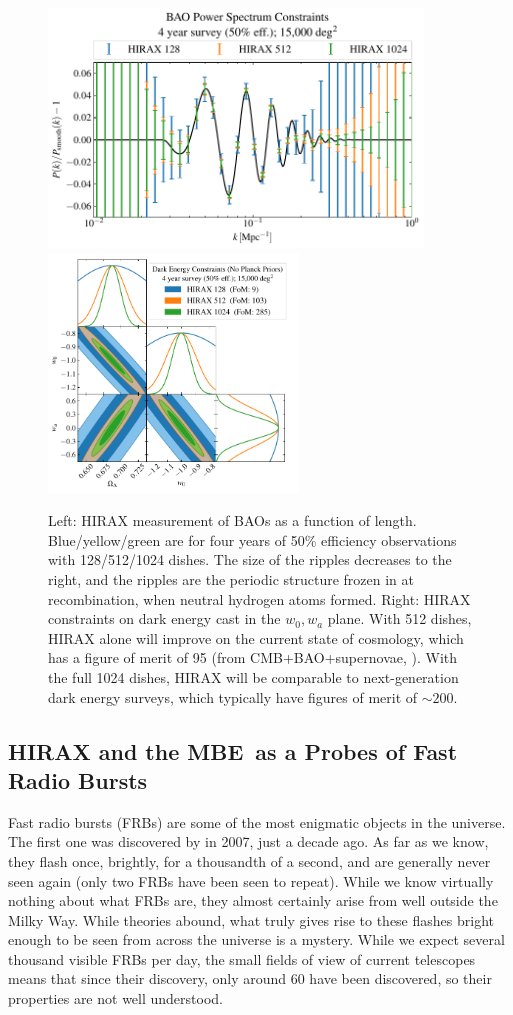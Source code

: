 \documentclass[letterpaper,11pt,preprint]{aastex}
\newcommand{\mbe}{{\rm MBE}}
\begin{document}
\begin{figure}[tbh]
  \includegraphics[height=2.5in]{hirax_bao_ps.pdf}
  \includegraphics[height=2.5in]{hirax_de_constraints.pdf}
\caption{\small Left:  HIRAX measurement of BAOs as a function of
  length.  Blue/yellow/green are for four years of 50\% efficiency
  observations with 128/512/1024 dishes.  The size of the ripples
  decreases to the right, and the ripples are the periodic structure
  frozen in at recombination, when neutral hydrogen atoms formed.
  Right:  HIRAX constraints on dark energy cast in the $w_0,w_a$
  plane.  With 512 dishes, HIRAX alone will improve on the current
  state of cosmology, which has a figure of merit of 95 (from
  CMB+BAO+supernovae, \citet{Planck2018Params}).  With the full 1024
  dishes, HIRAX will be comparable to next-generation dark energy
  surveys, which typically have figures of merit of $\sim 200$.
  \label{fig:hirax_de}
}
\end{figure}

\subsection{HIRAX and the \mbe\ as a Probes of Fast Radio Bursts}
Fast radio bursts (FRBs) are some of the most enigmatic objects in the
universe.  The first one was discovered by \citet{Lorimer07} in 2007,
just a decade ago.  As far as we know, they flash once, brightly, for
a thousandth of a second, and are generally never seen again (only two
FRBs have been seen to repeat).  While we know virtually nothing 
about what FRBs are, they almost certainly arise from well outside the
Milky Way.  While theories abound, what truly gives rise to these
flashes bright enough to be seen from across the universe is a
mystery.  While we expect several thousand visible FRBs per day, the small
fields of view of current telescopes means that since their discovery,
only around 60 have been discovered, so their properties are not well
understood. 
\end{document}
